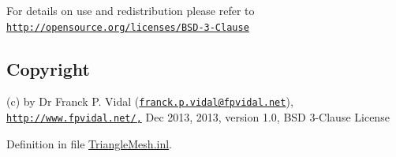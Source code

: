 For details on use and redistribution please refer to \href{http://opensource.org/licenses/BSD-3-Clause}{\tt http://opensource.org/licenses/BSD-\/3-\/Clause}\hypertarget{_x_ray_renderer_8inl_Copyright}{}\subsection{Copyright}\label{_x_ray_renderer_8inl_Copyright}
(c) by Dr Franck P. Vidal (\href{mailto:franck.p.vidal@fpvidal.net}{\tt franck.p.vidal@fpvidal.net}), \href{http://www.fpvidal.net/,}{\tt http://www.fpvidal.net/,} Dec 2013, 2013, version 1.0, BSD 3-\/Clause License 

Definition in file \hyperlink{_triangle_mesh_8inl_source}{TriangleMesh.inl}.

